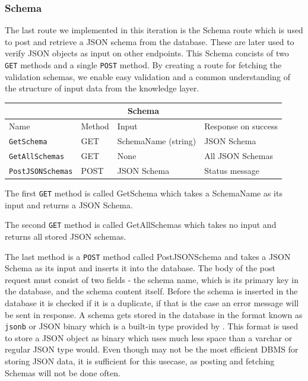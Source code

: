 \subsubsection{Schema}
The last route we implemented in this iteration is the Schema route which is used to post and retrieve a JSON schema from the database. These are later used to verify JSON objects as input on other endpoints. 
This Schema concists of two \texttt{GET} methods and a single \texttt{POST} method.
By creating a route for fetching the validation schemas, we enable easy validation and a common understanding of the structure of input data from the knowledge layer.
\begin{table}[h]
    \begin{tabular}{|llll|}
    \hline
    \multicolumn{4}{|c|}{\textbf{Schema}}                                                                                                     \\ \hline
    \multicolumn{1}{|l|}{Name}                     & \multicolumn{1}{l|}{Method} & \multicolumn{1}{l|}{Input}               & Response on success \\ \hline
    \multicolumn{1}{|l|}{\texttt{GetSchema}}       & \multicolumn{1}{l|}{GET}    & \multicolumn{1}{l|}{SchemaName (string)} & JSON Schema         \\ \hline
    \multicolumn{1}{|l|}{\texttt{GetAllSchemas}}   & \multicolumn{1}{l|}{GET}    & \multicolumn{1}{l|}{None}                & All JSON Schemas    \\ \hline
    \multicolumn{1}{|l|}{\texttt{PostJSONSchemas}} & \multicolumn{1}{l|}{POST}   & \multicolumn{1}{l|}{JSON Schema}         & Status message      \\ \hline
    \end{tabular}
    \end{table}

The first \texttt{GET} method is called GetSchema which takes a SchemaName as its input and returns a JSON Schema. 

The second \texttt{GET} method is called GetAllSchemas which takes no input and returns all stored JSON schemas. 

The last method is a \texttt{POST} method called PostJSONSchema and takes a JSON Schema as its input and inserts it into the database.
The body of the post request must consist of two fields - the schema name, which is its primary key in the database, and the schema content itself. Before the schema is inserted in the database it is checked if it is a duplicate, if that is the case an error message will be sent in response.
A schema gets stored in the database in the format known as \texttt{jsonb} or JSON binary which is a built-in type provided by \postgres{}.
This format is used to store a JSON object as binary which uses much less space than a varchar or regular JSON type would.
Even though \postgres{} may not be the most efficient DBMS for storing JSON data, it is sufficient for this usecase, as posting and fetching Schemas will not be done often.